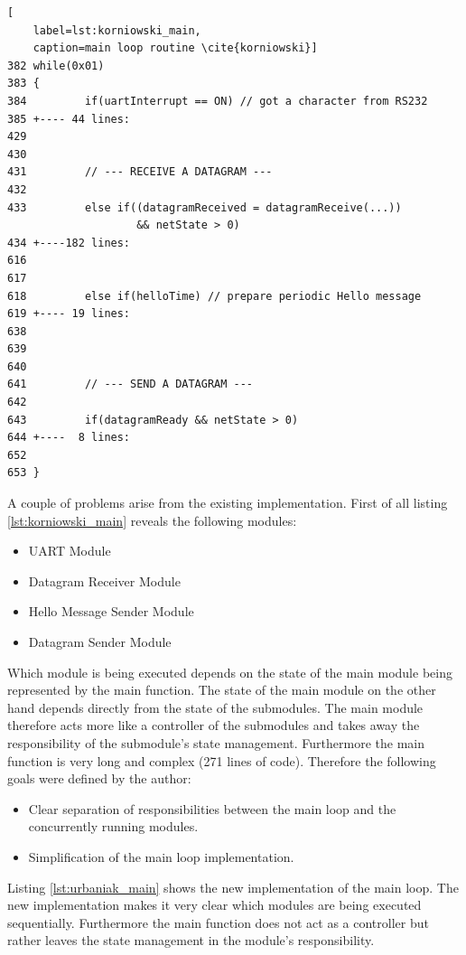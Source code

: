 \begin{lstlisting}[
	label=lst:korniowski_main,
	caption=main loop routine \cite{korniowski}]
382 while(0x01)
383 {
384         if(uartInterrupt == ON) // got a character from RS232
385 +---- 44 lines: 
429 
430 
431         // --- RECEIVE A DATAGRAM ---
432 
433         else if((datagramReceived = datagramReceive(...)) 
                    && netState > 0)     
434 +----182 lines: 
616 
617     
618         else if(helloTime) // prepare periodic Hello message
619 +---- 19 lines: 
638 
639 
640     
641         // --- SEND A DATAGRAM ---
642     
643         if(datagramReady && netState > 0)
644 +----  8 lines: 
652 
653 }
\end{lstlisting}

A couple of problems arise from the existing implementation. First of all listing \ref{lst:korniowski_main} reveals the following modules:

\begin{itemize}
    \item UART Module
    \item Datagram Receiver Module
    \item Hello Message Sender Module
    \item Datagram Sender Module
\end{itemize}

Which module is being executed depends on the state of the main module being represented by the main function. The state of the main module on the other hand depends directly from the state of the submodules. The main module therefore acts more like a controller of the submodules and takes away the responsibility of the submodule's state management. Furthermore the main function is very long and complex (271 lines of code). Therefore the following goals were defined by the author:

\begin{itemize}
    \item Clear separation of responsibilities between the main loop and the concurrently running modules.
    \item Simplification of the main loop implementation.
\end{itemize}

Listing \ref{lst:urbaniak_main} shows the new implementation of the main loop. The new implementation makes it very clear which modules are being executed sequentially. Furthermore the main function does not act as a controller but rather leaves the state management in the module's responsibility.


